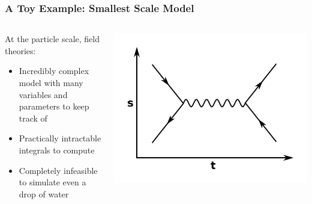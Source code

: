 \documentclass[aspectratio=169, 12pt]{beamer}
\begin{document}
\begin{frame}

    \frametitle{A Toy Example: Smallest Scale Model}

    \begin{columns}
    \begin{column}{.6\textwidth}
        At the particle scale, field theories:

        \begin{itemize}
            \item Incredibly complex model with many variables and parameters to keep track of
            \item Practically intractable integrals to compute
            \item Completely infeasible to simulate even a drop of water
        \end{itemize}
        
    \end{column}
    \begin{column}{.4\textwidth}
        \includegraphics[width=\textwidth]{images/feynman-diagram.jpg}
    \end{column}
    \end{columns}

\end{frame}
\end{document}
